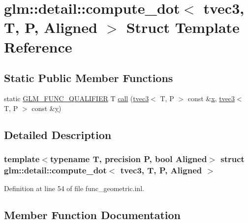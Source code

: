 \hypertarget{structglm_1_1detail_1_1compute__dot_3_01tvec3_00_01_t_00_01_p_00_01_aligned_01_4}{}\section{glm\+::detail\+::compute\+\_\+dot$<$ tvec3, T, P, Aligned $>$ Struct Template Reference}
\label{structglm_1_1detail_1_1compute__dot_3_01tvec3_00_01_t_00_01_p_00_01_aligned_01_4}
\subsection*{Static Public Member Functions}
\begin{DoxyCompactItemize}
\item 
static \mbox{\hyperlink{setup_8hpp_a33fdea6f91c5f834105f7415e2a64407}{G\+L\+M\+\_\+\+F\+U\+N\+C\+\_\+\+Q\+U\+A\+L\+I\+F\+I\+ER}} T \mbox{\hyperlink{structglm_1_1detail_1_1compute__dot_3_01tvec3_00_01_t_00_01_p_00_01_aligned_01_4_a319c4ec41a2c4fd3a22fe9467ae557da}{call}} (\mbox{\hyperlink{structglm_1_1tvec3}{tvec3}}$<$ T, P $>$ const \&\mbox{\hyperlink{glad_8h_a92d0386e5c19fb81ea88c9f99644ab1d}{x}}, \mbox{\hyperlink{structglm_1_1tvec3}{tvec3}}$<$ T, P $>$ const \&\mbox{\hyperlink{glad_8h_a66ddd433d2cacfe27f5906b7e86faeed}{y}})
\end{DoxyCompactItemize}


\subsection{Detailed Description}
\subsubsection*{template$<$typename T, precision P, bool Aligned$>$\newline
struct glm\+::detail\+::compute\+\_\+dot$<$ tvec3, T, P, Aligned $>$}



Definition at line 54 of file func\+\_\+geometric.\+inl.



\subsection{Member Function Documentation}
\mbox{\label{structglm_1_1detail_1_1compute__dot_3_01tvec3_00_01_t_00_01_p_00_01_aligned_01_4_a319c4ec41a2c4fd3a22fe9467ae557da}} 
